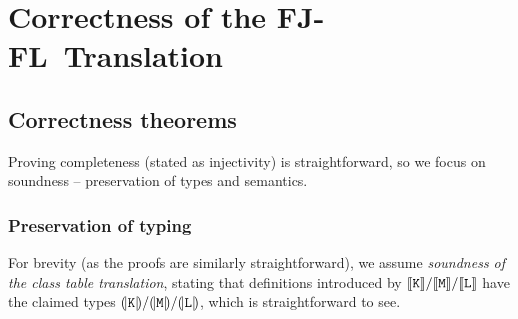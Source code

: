 \chapter{Correctness of the FJ-FL~Translation}
\label{extra:fj-fl-proofs}

\section{Correctness theorems}

Proving completeness (stated as injectivity) is straightforward, so we focus on soundness -- preservation of types and semantics. 

\subsection{Preservation of typing}

For brevity (as the proofs are similarly straightforward), we assume \emph{soundness of the class table translation}, stating that definitions introduced by $\denot {\fj K}/\denot {\fj M}/\denot {\fj L}$ have the claimed types $\denoty {\fj K}/\denoty {\fj M}/\denoty {\fj L}$, which is straightforward to see.
 
